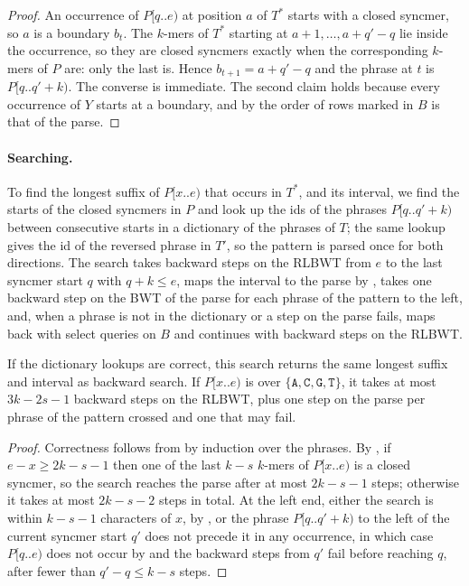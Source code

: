 \begin{proof}
An occurrence of $P[q..e)$ at position $a$ of $T^*$ starts with a closed
syncmer, so $a$ is a boundary $b_t$. The $k$-mers of $T^*$ starting at
$a + 1, \ldots, a + q' - q$ lie inside the occurrence, so they are
closed syncmers exactly when the corresponding $k$-mers of $P$ are:
only the last is. Hence $b_{t+1} = a + q' - q$ and the phrase at $t$ is
$P[q..q' + k)$. The converse is immediate. The second claim holds
because every occurrence of $Y$ starts at a boundary, and by
 the order of rows marked in $B$ is that of the parse.
\end{proof}

\paragraph*{Searching.}
To find the longest suffix of $P[x..e)$ that occurs in $T^*$, and its
interval, we find the starts of the closed syncmers in $P$ and look up
the ids of the phrases $P[q .. q' + k)$ between consecutive starts in a
dictionary of the phrases of $T$; the same lookup gives the id of the
reversed phrase in $T'$, so the pattern is parsed once for both
directions. The search takes backward steps on the RLBWT from $e$ to
the last syncmer start $q$ with $q + k \le e$, maps the interval to the
parse by , takes one backward step on the BWT of the
parse for each phrase of the pattern to the left, and, when a phrase is
not in the dictionary or a step on the parse fails, maps back with
select queries on $B$ and continues with backward steps on the RLBWT.

\begin{theorem}
\label{thm:twolevel}
If the dictionary lookups are correct, this search returns the same
longest suffix and interval as backward search. If $P[x..e)$ is over
$\{\texttt{A},\texttt{C},\texttt{G},\texttt{T}\}$, it takes at most $3k
- 2s - 1$ backward steps on the RLBWT, plus one step on the parse per
phrase of the pattern crossed and one that may fail.
\end{theorem}

\begin{proof}
Correctness follows from  by induction over the
phrases. By , if $e - x \ge 2k - s - 1$ then one of the
last $k - s$ $k$-mers of $P[x..e)$ is a closed syncmer, so the search
reaches the parse after at most $2k - s - 1$ steps; otherwise it takes
at most $2k - s - 2$ steps in total. At the left end, either the search
is within $k - s - 1$ characters of $x$, by , or the
phrase $P[q .. q' + k)$ to the left of the current syncmer start $q'$
does not precede it in any occurrence, in which case $P[q..e)$ does not
occur by  and the backward steps from $q'$ fail before
reaching $q$, after fewer than $q' - q \le k - s$ steps.
\end{proof}

